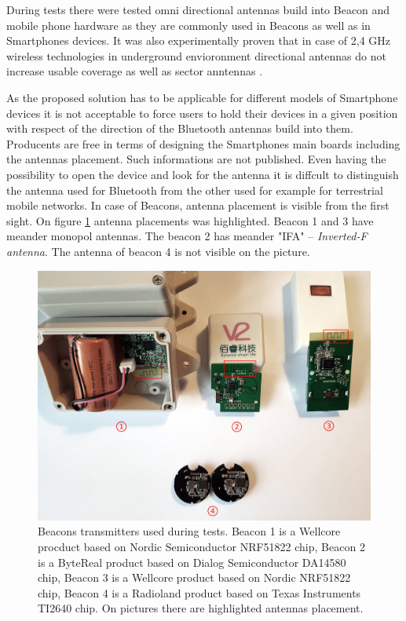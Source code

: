 \documentclass[../main.tex]{subfiles}
\begin{document}
During tests there were tested omni directional antennas build into Beacon and mobile phone hardware as they are commonly used in Beacons as well as in Smartphones devices. It was also experimentally proven that in case of 2,4 GHz wireless technologies in underground envioronment directional antennas do not increase usable coverage as well as sector anntennas \cite{Thesis_CM}.

As the proposed solution has to be applicable for different models of Smartphone devices it is not acceptable to force users to hold their devices in a given position with respect of the direction of the Bluetooth antennas build into them. Producents are free in terms of designing the Smartphones main boards including the antennas placement. Such informations are not published. Even having the possibility to open the device and look for the antenna it is diffcult to distinguish the antenna used for Bluetooth from the other used for example for terrestrial mobile networks. In case of Beacons, antenna placement is visible from the first sight. On figure \ref{fig:beacons_used_in_tests} antenna placements was highlighted. Beacon 1 and 3 have meander monopol antennas. The beacon 2 has meander "IFA" -- \textit{Inverted-F antenna}. The antenna of beacon 4 is not visible on the picture.

\begin{figure}[!htbp]
\includegraphics[width=\textwidth, keepaspectratio]{pictures/beacons_used_in_tests.pdf}
\centering
\caption{Beacons transmitters used during tests. Beacon 1 is a Wellcore procduct based on Nordic Semiconductor NRF51822 chip, Beacon 2 is a ByteReal product based on Dialog Semiconductor DA14580 chip, Beacon 3 is a Wellcore product based on Nordic NRF51822 chip, Beacon 4 is a Radioland product based on Texas Instruments TI2640 chip. On pictures there are highlighted antennas placement.}
\label{fig:beacons_used_in_tests}
\end{figure}
\end{document}
